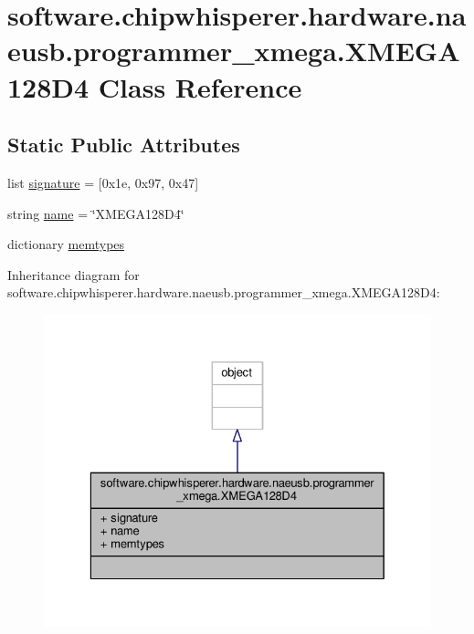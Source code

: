 \hypertarget{classsoftware_1_1chipwhisperer_1_1hardware_1_1naeusb_1_1programmer__xmega_1_1XMEGA128D4}{}\section{software.\+chipwhisperer.\+hardware.\+naeusb.\+programmer\+\_\+xmega.\+X\+M\+E\+G\+A128\+D4 Class Reference}
\label{classsoftware_1_1chipwhisperer_1_1hardware_1_1naeusb_1_1programmer__xmega_1_1XMEGA128D4}
\subsection*{Static Public Attributes}
\begin{DoxyCompactItemize}
\item 
list \hyperlink{classsoftware_1_1chipwhisperer_1_1hardware_1_1naeusb_1_1programmer__xmega_1_1XMEGA128D4_a8052ecbb3c75bea622ecf5d842d136f5}{signature} = \mbox{[}0x1e, 0x97, 0x47\mbox{]}
\item 
string \hyperlink{classsoftware_1_1chipwhisperer_1_1hardware_1_1naeusb_1_1programmer__xmega_1_1XMEGA128D4_ac4071eb86a6637805093cb8fb9712c3c}{name} = \char`\"{}X\+M\+E\+G\+A128\+D4\char`\"{}
\item 
dictionary \hyperlink{classsoftware_1_1chipwhisperer_1_1hardware_1_1naeusb_1_1programmer__xmega_1_1XMEGA128D4_a4ab483d6d6496c8849ba0bbfa1204b85}{memtypes}
\end{DoxyCompactItemize}


Inheritance diagram for software.\+chipwhisperer.\+hardware.\+naeusb.\+programmer\+\_\+xmega.\+X\+M\+E\+G\+A128\+D4\+:\nopagebreak
\begin{figure}[H]
\begin{center}
\leavevmode
\includegraphics[width=329pt]{da/db5/classsoftware_1_1chipwhisperer_1_1hardware_1_1naeusb_1_1programmer__xmega_1_1XMEGA128D4__inherit__graph}
\end{center}
\end{figure}


